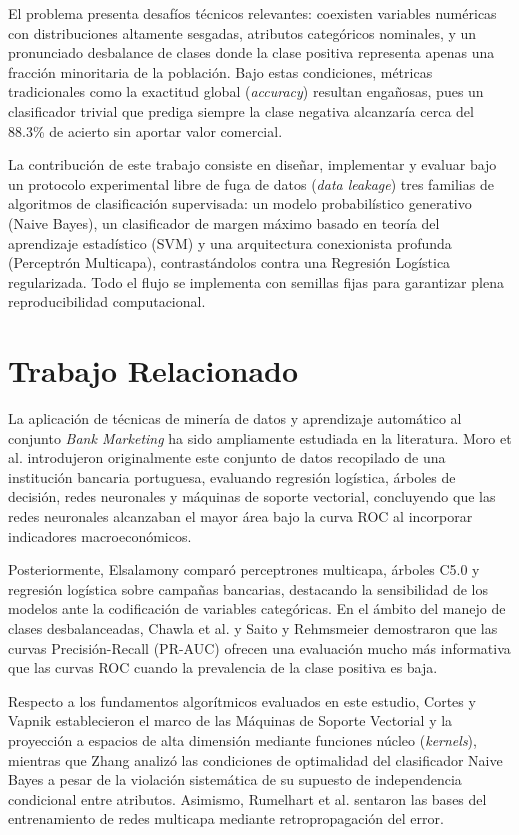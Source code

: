 \documentclass[conference]{IEEEtran}
\begin{document}
El problema presenta desafíos técnicos relevantes: coexisten variables numéricas con distribuciones altamente sesgadas, atributos categóricos nominales, y un pronunciado desbalance de clases donde la clase positiva representa apenas una fracción minoritaria de la población. Bajo estas condiciones, métricas tradicionales como la exactitud global (\textit{accuracy}) resultan engañosas, pues un clasificador trivial que prediga siempre la clase negativa alcanzaría cerca del 88.3\% de acierto sin aportar valor comercial.

La contribución de este trabajo consiste en diseñar, implementar y evaluar bajo un protocolo experimental libre de fuga de datos (\textit{data leakage}) tres familias de algoritmos de clasificación supervisada: un modelo probabilístico generativo (Naive Bayes), un clasificador de margen máximo basado en teoría del aprendizaje estadístico (SVM) y una arquitectura conexionista profunda (Perceptrón Multicapa), contrastándolos contra una Regresión Logística regularizada. Todo el flujo se implementa con semillas fijas para garantizar plena reproducibilidad computacional.

\section{Trabajo Relacionado}
La aplicación de técnicas de minería de datos y aprendizaje automático al conjunto \textit{Bank Marketing} ha sido ampliamente estudiada en la literatura. Moro et al. \cite{moro2014} introdujeron originalmente este conjunto de datos recopilado de una institución bancaria portuguesa, evaluando regresión logística, árboles de decisión, redes neuronales y máquinas de soporte vectorial, concluyendo que las redes neuronales alcanzaban el mayor área bajo la curva ROC al incorporar indicadores macroeconómicos.

Posteriormente, Elsalamony \cite{elsalamony2014} comparó perceptrones multicapa, árboles C5.0 y regresión logística sobre campañas bancarias, destacando la sensibilidad de los modelos ante la codificación de variables categóricas. En el ámbito del manejo de clases desbalanceadas, Chawla et al. \cite{chawla2002} y Saito y Rehmsmeier \cite{saito2015} demostraron que las curvas Precisión-Recall (PR-AUC) ofrecen una evaluación mucho más informativa que las curvas ROC cuando la prevalencia de la clase positiva es baja.

Respecto a los fundamentos algorítmicos evaluados en este estudio, Cortes y Vapnik \cite{cortes1995} establecieron el marco de las Máquinas de Soporte Vectorial y la proyección a espacios de alta dimensión mediante funciones núcleo (\textit{kernels}), mientras que Zhang \cite{zhang2004} analizó las condiciones de optimalidad del clasificador Naive Bayes a pesar de la violación sistemática de su supuesto de independencia condicional entre atributos. Asimismo, Rumelhart et al. \cite{rumelhart1986} sentaron las bases del entrenamiento de redes multicapa mediante retropropagación del error.
\end{document}
